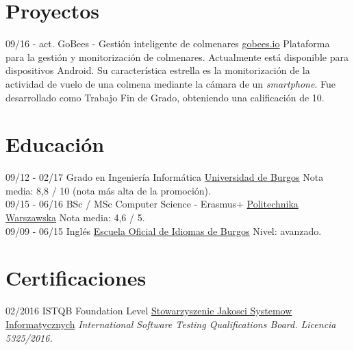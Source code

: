 \documentclass[]{friggeri-cv}
\begin{document}
\section{Proyectos}
\begin{entrylist}
  \entry
    {09/16 - act.}
    {GoBees - Gestión inteligente de colmenares}
    {\href{http://gobees.io/}{gobees.io}}
    {Plataforma para la gestión y monitorización de colmenares. Actualmente está disponible para dispositivos Android. Su característica estrella es la monitorización de la actividad de vuelo de una colmena mediante la cámara de un \emph{smartphone}. Fue desarrollado como Trabajo Fin de Grado, obteniendo una calificación de 10.}
\end{entrylist}

\section{Educación}
\begin{entrylist}
  \entry
    {09/12 - 02/17}
    {Grado en Ingeniería Informática}
    {\href{http://wwww.ubu.es/}{Universidad de Burgos}}
    {Nota media: 8,8 / 10 (nota más alta de la promoción).\\}
  \entry
    {09/15 - 06/16}
    {BSc / MSc Computer Science - Erasmus+}
    {\href{https://www.pw.edu.pl/}{Politechnika Warszawska}}
    {Nota media: 4,6 / 5.\\}
  \entry
    {09/09 - 06/15}
    {Inglés}
    {\href{http://eoiburgos.centros.educa.jcyl.es/}{Escuela Oficial de Idiomas de Burgos}}
    {Nivel: avanzado.\\}
\end{entrylist}

\section{Certificaciones}
\begin{entrylist}
  \entry
    {02/2016}
    {ISTQB Foundation Level}
    {\href{http://sjsi.org/}{Stowarzyszenie Jakosci Systemow Informatycznych}}
    {\emph{International Software Testing Qualifications Board. Licencia 5325/2016.}}
\end{entrylist}

\newpage
\end{document}
